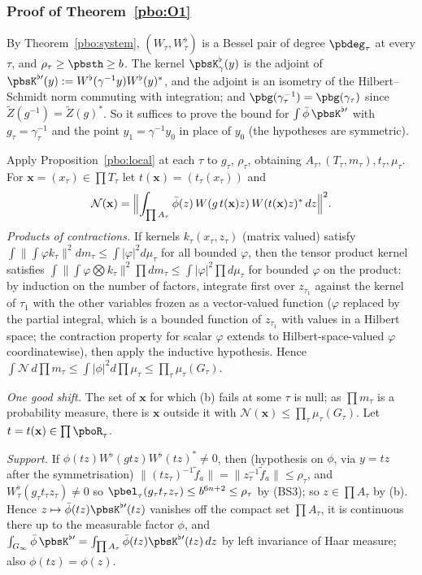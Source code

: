 \documentclass[10pt]{amsart}
\theoremstyle{definition}
\theoremstyle{remark}
\begin{document}
\subsubsection{Proof of Theorem~\ref{pbo:O1}}\label{pbo:ss-proof}

By Theorem~\ref{pbo:system}, $(W_\tau,W^\flat_\tau)$ is a Bessel pair of degree $\pbdeg_\tau$ at every $\tau$,
and $\rho_\tau\ge\pbsth\ge b$. The kernel $\pbsK^\flat_\gamma(y)$ is the adjoint of $\pbsK^{\flat\prime}(y):=
W^\flat(\gamma^{-1}y)W^\flat(y)^*$, and the adjoint is an isometry of the Hilbert--Schmidt norm commuting
with integration; and $\pbg(\gamma_\tau^{-1})=\pbg(\gamma_\tau)$ since $\tilde Z(g^{-1})=\tilde Z(g)^*$. So it
suffices to prove the bound for $\int\bar\phi\,\pbsK^{\flat\prime}$ with $g_\tau=\gamma^{-1}_\tau$ and the point
$y_1=\gamma^{-1}y_0$ in place of $y_0$ (the hypotheses are symmetric).

Apply Proposition~\ref{pbo:local} at each $\tau$ to $g_\tau$, $\rho_\tau$, obtaining $A_\tau,(T_\tau,m_\tau),t_\tau,
\mu_\tau$. For $\mathbf x=(x_\tau)\in\prod T_\tau$ let $t(\mathbf x)=(t_\tau(x_\tau))$ and
\[
\mathcal N(\mathbf x)=\Bigl\|\int_{\prod A_\tau}\bar\phi(z)\,W(g\,t(\mathbf x)z)\,W(t(\mathbf x)z)^*\,dz\Bigr\|^2 .
\]
\emph{Products of contractions.} If kernels $k_\tau(x_\tau,z_\tau)$ (matrix valued) satisfy
$\int\|\int\varphi k_\tau\|^2dm_\tau\le\int|\varphi|^2d\mu_\tau$ for all bounded $\varphi$, then the tensor product
kernel satisfies $\int\|\int\varphi\bigotimes k_\tau\|^2\prod dm_\tau\le\int|\varphi|^2\prod d\mu_\tau$ for bounded
$\varphi$ on the product: by induction on the number of factors, integrate first over $z_{\tau_1}$ against the
kernel of $\tau_1$ with the other variables frozen as a vector-valued function ($\varphi$ replaced by the
partial integral, which is a bounded function of $z_{\tau_1}$ with values in a Hilbert space; the
contraction property for scalar $\varphi$ extends to Hilbert-space-valued $\varphi$ coordinatewise), then apply
the inductive hypothesis. Hence $\int\mathcal N\,d\prod m_\tau\le\int|\phi|^2d\prod\mu_\tau\le\prod_\tau\mu_\tau(
G_\tau)$.

\emph{One good shift.} The set of $\mathbf x$ for which (b) fails at some $\tau$ is null; as $\prod m_\tau$ is a
probability measure, there is $\mathbf x$ outside it with $\mathcal N(\mathbf x)\le\prod_\tau\mu_\tau(G_\tau)$.
Let $t=t(\mathbf x)\in\prod\pboR_\tau$.

\emph{Support.} If $\phi(tz)W^\flat(gtz)W^\flat(tz)^*\ne0$, then (hypothesis on $\phi$, via $y=tz$ after the
symmetrisation) $\|(tz_\tau)^{-1}\tilde f_a\|=\|z_\tau^{-1}\tilde f_a\|\le\rho_\tau$, and $W^\flat_\tau(g_\tau t_\tau
z_\tau)\ne0$ so $\pbel_\tau(g_\tau t_\tau z_\tau)\le b^{6n+2}\le\rho_\tau$ by (BS3); so $z\in\prod A_\tau$ by (b).
Hence $z\mapsto\bar\phi(tz)\pbsK^{\flat\prime}(tz)$ vanishes off the compact set $\prod A_\tau$, it is continuous
there up to the measurable factor $\phi$, and $\int_{G_\infty}\bar\phi\,\pbsK^{\flat\prime}=\int_{\prod A_\tau}\bar\phi(tz)
\pbsK^{\flat\prime}(tz)\,dz$ by left invariance of Haar measure; also $\phi(tz)=\phi(z)$.
\end{document}
